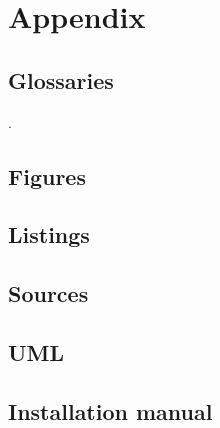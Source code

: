 \documentclass[12pt]{article}
\begin{document}
\section{Appendix}
\label{sec:appenix}

\subsection{Glossaries}
\label{subsec:glossaries}
\begingroup
\renewcommand{\section}[2]{}
\printglossary[style=tree]
\endgroup
\newpage

{\small\color{white}.}
\vspace{-2cm}
\subsection{Figures}
\label{subsec:figures}
\begingroup
\renewcommand{\section}[2]{}
\listoffigures
\endgroup

\subsection{Listings}
\label{subsec:listings}
\begingroup
\renewcommand{\section}[2]{}
\lstlistoflistings
\endgroup

\subsection{Sources}
\label{subsec:sources}
\begingroup
\renewcommand{\section}[2]{}


\endgroup

\newpage
\label{subsec:scrumcontract}

 

\subsection{UML}

\subsection{Installation manual}
\label{subsec:isntalman}

\end{document}
